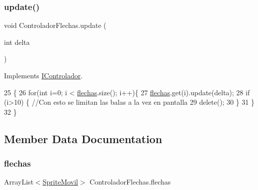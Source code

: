 \subsubsection{\texorpdfstring{update()}{update()}}
{\footnotesize\ttfamily void Controlador\+Flechas.\+update (\begin{DoxyParamCaption}\item[{int}]{delta }\end{DoxyParamCaption})\hspace{0.3cm}{\ttfamily [inline]}}



Implements \mbox{\hyperlink{interface_i_controlador_a06ccd4613ae1662a3a45620104c5224b}{I\+Controlador}}.


\begin{DoxyCode}
25                                  \{
26         \textcolor{keywordflow}{for}(\textcolor{keywordtype}{int} i=0; i < \mbox{\hyperlink{class_controlador_flechas_a1214f7644979b0d063796611a3965201}{flechas}}.size(); i++)\{
27             \mbox{\hyperlink{class_controlador_flechas_a1214f7644979b0d063796611a3965201}{flechas}}.get(i).update(delta);
28             \textcolor{keywordflow}{if} (i>10) \{ \textcolor{comment}{//Con esto se limitan las balas a la vez en pantalla}
29                 \textcolor{keyword}{delete}();
30             \}
31         \}
32     \}
\end{DoxyCode}


\subsection{Member Data Documentation}
\mbox{\label{class_controlador_flechas_a1214f7644979b0d063796611a3965201}} 
\subsubsection{\texorpdfstring{flechas}{flechas}}
{\footnotesize\ttfamily Array\+List$<$\mbox{\hyperlink{class_sprite_movil}{Sprite\+Movil}}$>$ Controlador\+Flechas.\+flechas\hspace{0.3cm}{\ttfamily [private]}}

